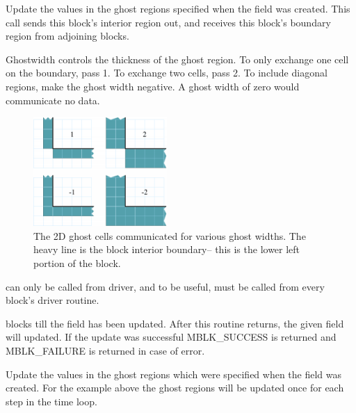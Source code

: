 \documentclass[10pt]{article}
\begin{document}
\vspace{0.2in}

     Update the values in the ghost regions specified when the
     field was created.  This call sends this block's interior region out,
     and receives this block's boundary region from adjoining blocks.

     Ghostwidth controls the thickness of the ghost region. To only exchange
     one cell on the boundary, pass 1.  To exchange two cells, pass 2. 
     To include diagonal regions, make the ghost width negative.
     A ghost width of zero would communicate no data.

\begin{figure}[h]
\begin{center}
\includegraphics[width=2in]{fig/ghostwidth}
\end{center}
\caption{The 2D ghost cells communicated for various ghost widths.  The heavy line
is the block interior boundary-- this is the lower left portion of the block.}
\label{fig:ghostwidth}
\end{figure}      

      can only be called from driver, and to be useful,
     must be called from every block's driver routine.

      blocks till the field has been updated.
     After this routine returns, the given field will updated.
     If the update was successful MBLK\_SUCCESS is returned and 
     MBLK\_FAILURE is returned in case of error.

\vspace{0.2in}
     Update the values in the ghost regions which were specified when the
     field was created. For the example above the ghost regions will be 
     updated once for each step in the time loop.
\end{document}
